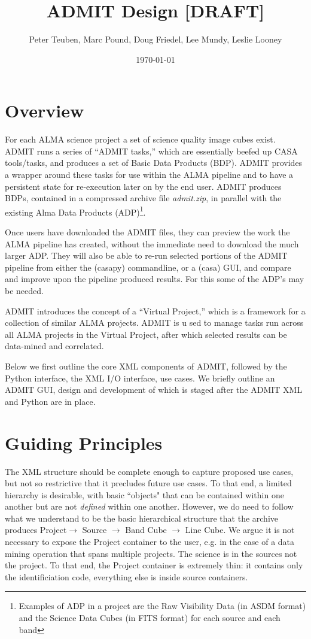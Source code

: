 \documentclass{article}
\title{ADMIT Design [DRAFT]}
\author{Peter Teuben, Marc Pound, Doug Friedel, Lee Mundy, Leslie Looney}
\date{\today}
\begin{document}
\maketitle

\section{Overview}

For each ALMA science project a set of science quality image cubes
exist. ADMIT runs a series of ``ADMIT tasks,'' which are essentially beefed
up CASA tools/tasks, and produces a set of Basic Data Products (BDP).
ADMIT provides a wrapper around these tasks for use within the ALMA pipeline
and to have a persistent state for re-execution later on by the end user.
ADMIT produces BDPs, contained in a compressed archive file {\it admit.zip},
in parallel with the existing
Alma Data Products (ADP)\footnote{Examples of ADP in a project are
the Raw Visibility Data (in ASDM format) and the Science Data Cubes
(in FITS format) for each source and each band}.

Once users have downloaded the ADMIT files, they can preview the work
the ALMA pipeline has created, without the immediate need to download the
much larger ADP. They will also be able to re-run selected portions
of the ADMIT pipeline from either the (casapy) commandline, or a
(casa) GUI, and compare and improve upon the pipeline produced
results. For this some of the ADP's may be needed.

ADMIT introduces the concept of a ``Virtual Project,'' which is a framework
for a collection of similar ALMA projects.  ADMIT is u sed to manage
tasks run across all ALMA projects in the Virtual Project, after which
selected results can be data-mined and correlated.

Below we first outline the core XML components of ADMIT, followed by
the Python interface, the XML I/O interface, use cases. We briefly
outline an ADMIT GUI, design and development of which is staged after
the ADMIT XML and Python are in place.

\section{Guiding Principles}

The XML structure should be complete enough to capture proposed use cases,
but not so restrictive that it precludes future use cases. To that end, a
limited hierarchy is desirable, with basic ``objects" that can be contained
within one another but are not {\it defined} within one another.  However, we
do need to follow what we understand to be the basic hierarchical structure
that the archive produces 
Project$\rightarrow$ Source $\rightarrow$ Band Cube $\rightarrow$ Line Cube.
We argue it is not necessary to expose the Project container to
the user, e.g. in the case of a data mining operation that spans multiple
projects. The science is in the sources not the project. To that end, the
Project container is extremely thin: it contains only the identificiation
code, everything else is inside source containers.
\end{document}
